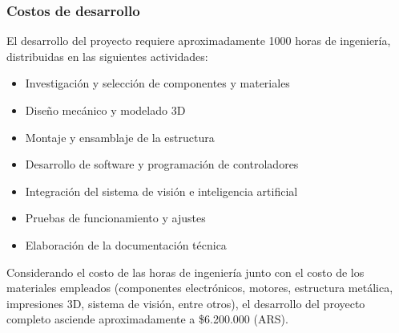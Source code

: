 \subsubsection{Costos de desarrollo}

El desarrollo del proyecto requiere aproximadamente 1000 horas de ingeniería, distribuidas en las siguientes actividades:

\begin{itemize}
    \item Investigación y selección de componentes y materiales
    \item Diseño mecánico y modelado 3D
    \item Montaje y ensamblaje de la estructura
    \item Desarrollo de software y programación de controladores
    \item Integración del sistema de visión e inteligencia artificial
    \item Pruebas de funcionamiento y ajustes
    \item Elaboración de la documentación técnica
\end{itemize}

Considerando el costo de las horas de ingeniería junto con el costo de los materiales empleados (componentes electrónicos, motores, estructura metálica, impresiones 3D, sistema de visión, entre otros), el desarrollo del proyecto completo asciende aproximadamente a \$6.200.000 (ARS).
